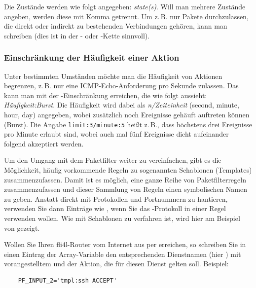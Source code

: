 Die Zustände werden wie folgt angegeben:
\emph{state(s)}. Will man mehrere
Zustände angeben, werden diese mit Komma getrennt. Um z.\,B. nur Pakete
durchzulassen, die direkt oder indirekt zu bestehenden Verbindungen gehören,
kann man  schreiben (dies ist
in der - oder -Kette sinnvoll).

\subsubsection{Einschränkung der Häufigkeit einer Aktion}

Unter bestimmten Umständen möchte man die Häufigkeit von Aktionen
begrenzen, z.\,B. nur eine ICMP-Echo-Anforderung pro Sekunde zulassen. Das
kann man mit der -Einschränkung erreichen, die wie folgt
aussieht: \emph{Häufigkeit:Burst}. Die
Häufigkeit wird dabei als \emph{n/Zeiteinheit} (second, minute, hour, day)
angegeben, wobei zusätzlich noch Ereignisse gehäuft auftreten
können (Burst). Die Angabe \texttt{limit:3/minute:5} heißt z.\,B., dass
höchstens drei Ereignisse pro Minute erlaubt sind, wobei auch mal fünf
Ereignisse dicht aufeinander folgend akzeptiert werden.


Um den Umgang mit dem Paketfilter weiter zu vereinfachen, gibt es die
Möglichkeit, häufig vorkommende Regeln zu sogenannten Schablonen (Templates)
zusammenzufassen. Damit ist es möglich, eine ganze Reihe von
Paketfilterregeln zusammenzufassen und dieser Sammlung von Regeln
einen symbolischen Namen zu geben. Anstatt direkt mit Protokollen und
Portnummern zu hantieren, verwenden Sie dann Einträge wie ,
wenn Sie das -Protokoll in einer Regel verwenden wollen. Wie mit
Schablonen zu verfahren ist, wird hier am Beispiel von  gezeigt.

Wollen Sie Ihren fli4l-Router vom Internet aus per  erreichen, so
schreiben Sie in einen Eintrag der Array-Variable  den
entsprechenden Dienstnamen (hier ) mit vorangestelltem
 und der Aktion, die für diesen Dienst gelten soll. Beispiel:

\begin{example}
\begin{verbatim}
    PF_INPUT_2='tmpl:ssh ACCEPT'
\end{verbatim}
\end{example}

